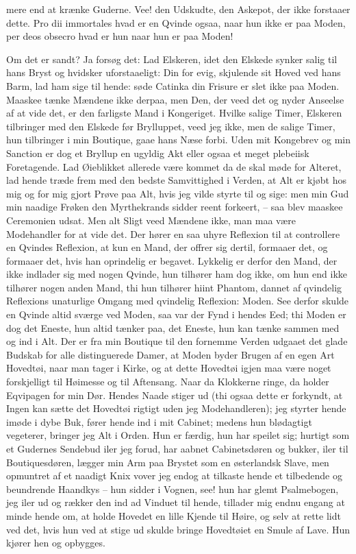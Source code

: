 \documentclass[12pt,a4paper]{article}
\begin{document}
mere end at krænke Guderne. Vee! den Udskudte, den Askepot, der ikke forstaaer dette. Pro dii immortales hvad er en Qvinde ogsaa, naar hun ikke er paa Moden, per deos obsecro hvad er hun naar hun er paa Moden!

Om det er sandt? Ja forsøg det: Lad Elskeren, idet den Elskede synker salig til hans Bryst og hvidsker uforstaaeligt: Din for evig, skjulende sit Hoved ved hans Barm, lad ham sige til hende: søde Catinka din Frisure er slet ikke paa Moden. Maaskee tænke Mændene ikke derpaa, men Den, der veed det og nyder Anseelse af at vide det, er den farligste Mand i Kongeriget. Hvilke salige Timer, Elskeren tilbringer med den Elskede før Brylluppet, veed jeg ikke, men de salige Timer, hun tilbringer i min Boutique, gaae hans Næse forbi. Uden mit Kongebrev og min Sanction er dog et Bryllup en ugyldig Akt eller ogsaa et meget plebeiisk Foretagende. Lad Øieblikket allerede være kommet da de skal møde for Alteret, lad hende træde frem med den bedste Samvittighed i Verden, at Alt er kjøbt hos mig og for mig gjort Prøve paa Alt, hvis jeg vilde styrte til og sige: men min Gud min naadige Frøken den Myrthekrands sidder reent forkeert, – saa blev maaskee Ceremonien udsat. Men alt Sligt veed Mændene ikke, man maa være Modehandler for at vide det. Der hører en saa uhyre Reflexion til at controllere en Qvindes Reflexion, at kun en Mand, der offrer sig dertil, formaaer det, og formaaer det, hvis han oprindelig er begavet. Lykkelig er derfor den Mand, der ikke indlader sig med nogen Qvinde, hun tilhører ham dog ikke, om hun end ikke tilhører nogen anden Mand, thi hun tilhører hiint Phantom, dannet af qvindelig Reflexions unaturlige Omgang med qvindelig Reflexion: Moden. See derfor skulde en Qvinde altid sværge ved Moden, saa var der Fynd i hendes Eed; thi Moden er dog det Eneste, hun altid tænker paa, det Eneste, hun kan tænke sammen med og ind i Alt. Der er fra min Boutique til den fornemme Verden udgaaet det glade Budskab for alle distinguerede Damer, at Moden byder Brugen af en egen Art Hovedtøi, naar man tager i Kirke, og at dette Hovedtøi igjen maa være noget forskjelligt til Høimesse og til Aftensang. Naar da Klokkerne ringe, da holder Eqvipagen for min Dør. Hendes Naade stiger ud (thi ogsaa dette er forkyndt, at Ingen kan sætte det Hovedtøi rigtigt uden jeg Modehandleren); jeg styrter hende imøde i dybe Buk, fører hende ind i mit Cabinet; medens hun blødagtigt vegeterer, bringer jeg Alt i Orden. Hun er færdig, hun har speilet sig; hurtigt som et Gudernes Sendebud iler jeg forud, har aabnet Cabinetsdøren og bukker, iler til Boutiquesdøren, lægger min Arm paa Brystet som en østerlandsk Slave, men opmuntret af et naadigt Knix vover jeg endog at tilkaste hende et tilbedende og beundrende Haandkys – hun sidder i Vognen, see! hun har glemt Psalmebogen, jeg iler ud og rækker den ind ad Vinduet til hende, tillader mig endnu engang at minde hende om, at holde Hovedet en lille Kjende til Høire, og selv at rette lidt ved det, hvis hun ved at stige ud skulde bringe Hovedtøiet en Smule af Lave. Hun kjører hen og opbygges.
\end{document}
